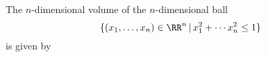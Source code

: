 

\begin{theorem}
The $n$-dimensional volume of the $n$-dimensional ball 
$$
\{ (x_1,\ldots,x_n)\in\RR^n\,|\, x_1^2+\cdots x_n^2 \leq 1 \}
$$
is given by 


\end{theorem}

